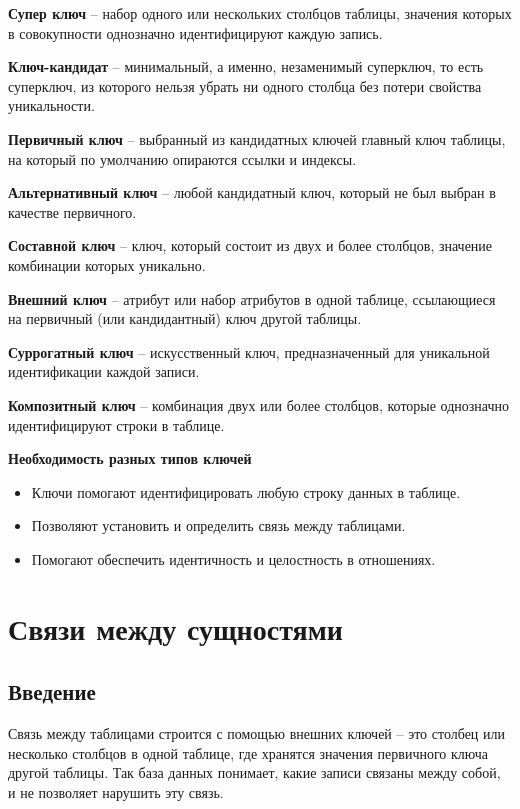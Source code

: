 \documentclass[a4paper,12pt]{report}
\begin{document}
\textbf{Супер ключ} -- набор одного или нескольких столбцов таблицы, значения которых в совокупности однозначно идентифицируют каждую запись.

\textbf{Ключ-кандидат} -- минимальный, а именно, незаменимый суперключ, то есть суперключ, из которого нельзя убрать ни одного столбца без потери свойства уникальности.

\textbf{Первичный ключ} -- выбранный из кандидатных ключей главный ключ таблицы, на который по умолчанию опираются ссылки и индексы.

\textbf{Альтернативный ключ} -- любой кандидатный ключ, который не был выбран в качестве первичного.

\textbf{Составной ключ} -- ключ, который состоит из двух и более столбцов, значение комбинации которых уникально.

\textbf{Внешний ключ} -- атрибут или набор атрибутов в одной таблице, ссылающиеся на первичный (или кандидантный) ключ другой таблицы.

\textbf{Суррогатный ключ} -- искусственный ключ, предназначенный для уникальной идентификации каждой записи.

\textbf{Композитный ключ} -- комбинация двух или более столбцов, которые однозначно идентифицируют строки в таблице.

\textbf{Необходимость разных типов ключей}
\begin{itemize}
    \item
        Ключи помогают идентифицировать любую строку данных в таблице. 
    \item
        Позволяют установить и определить связь между таблицами.
    \item
        Помогают обеспечить идентичность и целостность в отношениях.
\end{itemize}

\section{Связи между сущностями}

\subsection{Введение}

Связь между таблицами строится с помощью внешних ключей -- это столбец или несколько столбцов в одной таблице, 
где хранятся значения первичного ключа другой таблицы. Так база данных понимает, какие записи связаны между собой, 
и не позволяет нарушить эту связь.
\end{document}
